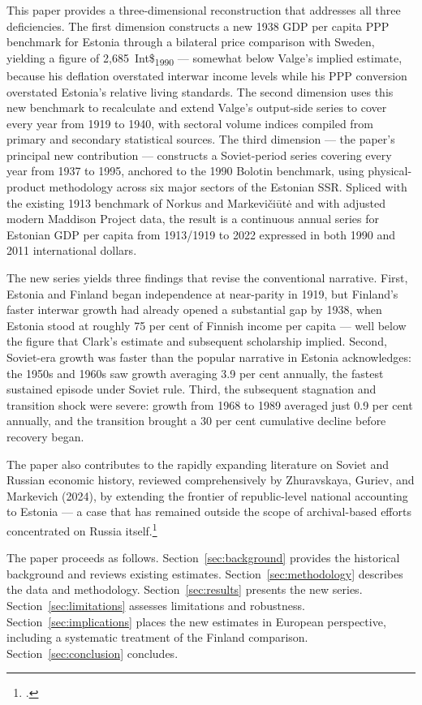 \documentclass[12pt,a4paper]{article}
\newcommand{\intlnineteen}{Int\$\textsubscript{1990}}   %
\begin{document}
This paper provides a three-dimensional reconstruction that addresses all three deficiencies. The first dimension constructs a new 1938 GDP per capita PPP benchmark for Estonia through a bilateral price comparison with Sweden, yielding a figure of 2,685~\intlnineteen{} — somewhat below Valge's implied estimate, because his deflation overstated interwar income levels while his PPP conversion overstated Estonia's relative living standards. The second dimension uses this new benchmark to recalculate and extend Valge's output-side series to cover every year from 1919 to 1940, with sectoral volume indices compiled from primary and secondary statistical sources. The third dimension — the paper's principal new contribution — constructs a Soviet-period series covering every year from 1937 to 1995, anchored to the 1990 Bolotin benchmark, using physical-product methodology across six major sectors of the Estonian SSR. Spliced with the existing 1913 benchmark of Norkus and Markevičiūtė and with adjusted modern Maddison Project data, the result is a continuous annual series for Estonian GDP per capita from 1913/1919 to 2022 expressed in both 1990 and 2011 international dollars.

The new series yields three findings that revise the conventional narrative. First, Estonia and Finland began independence at near-parity in 1919, but Finland's faster interwar growth had already opened a substantial gap by 1938, when Estonia stood at roughly 75 per cent of Finnish income per capita — well below the figure that Clark's estimate and subsequent scholarship implied. Second, Soviet-era growth was faster than the popular narrative in Estonia acknowledges: the 1950s and 1960s saw growth averaging 3.9 per cent annually, the fastest sustained episode under Soviet rule. Third, the subsequent stagnation and transition shock were severe: growth from 1968 to 1989 averaged just 0.9 per cent annually, and the transition brought a 30 per cent cumulative decline before recovery began.

The paper also contributes to the rapidly expanding literature on Soviet and Russian economic history, reviewed comprehensively by Zhuravskaya, Guriev, and Markevich (2024), by extending the frontier of republic-level national accounting to Estonia — a case that has remained outside the scope of archival-based efforts concentrated on Russia itself.\footnote{\autocite{zhuravskaya2024}.}

The paper proceeds as follows. Section~\ref{sec:background} provides the historical background and reviews existing estimates. Section~\ref{sec:methodology} describes the data and methodology. Section~\ref{sec:results} presents the new series. Section~\ref{sec:limitations} assesses limitations and robustness. Section~\ref{sec:implications} places the new estimates in European perspective, including a systematic treatment of the Finland comparison. Section~\ref{sec:conclusion} concludes.
\end{document}
